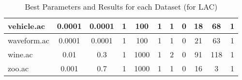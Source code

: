 \begin{table}[htbp]
\begin{tabular}{|l|c|c|c|c|c|c|c|c|c|c|}
		\hline
		vehicle.ac     & 0.0001   & 0.0001      & 1              & 100                 & 1             & 1             & 0              & 18             & 68             & 1              \\
		\hline
		waveform.ac    & 0.0001   & 0.0001      & 1              & 100                 & 1             & 1             & 0              & 21             & 63             & 1              \\
		\hline
		wine.ac        & 0.01     & 0.3         & 1              & 1000                & 1             & 2             & 0              & 91             & 118            & 1              \\
		\hline
		zoo.ac         & 0.001    & 0.7         & 1              & 1000                & 1             & 1             & 0              & 16             & 3              & 1              \\
		\hline
		\end{tabular}
	\caption{Best Parameters and Results for each Dataset (for LAC)}
	\label{tab:best_runs_for_each_db_lac}
\end{table}
